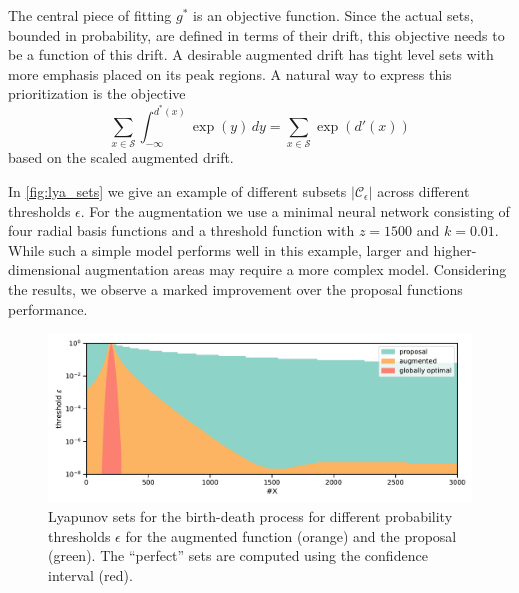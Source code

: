 The central piece of fitting $g^*$ is an objective function.
Since the actual sets, bounded in probability, are defined in terms of their drift, this objective needs to be a function of this drift.
A desirable augmented drift has tight level sets with more emphasis placed on its peak regions.
A natural way to express this prioritization is the objective
\[\sum_{x\in\mathcal{S}}\int_{-\infty}^{d^*(x)}\exp(y)\,dy = \sum_{x\in\mathcal{S}} \exp(d'(x)) \]
based on the scaled augmented drift.

In \autoref{fig:lya_sets} we give an example of different subsets $\left|\mathcal{C}_{\epsilon}\right|$ across different thresholds $\epsilon$.
For the augmentation we use a minimal neural network consisting of four radial basis functions and a threshold function with $z=1500$ and $k=0.01$.
While such a simple model performs well in this example, larger and higher-dimensional augmentation areas may require a more complex model.
Considering the results, we observe a marked improvement over the proposal functions performance.
\begin{figure}[htb]
\centering
\includegraphics[width=\textwidth]{gfx/lya_sets.pdf}
	\caption[Augmented v.\ proposal Lyapunov sets]{\label{fig:lya_sets}Lyapunov sets for the birth-death process for different probability thresholds $\epsilon$ for the augmented function (orange) and the proposal (green). The ``perfect'' sets are computed using the confidence interval (red).}
\end{figure}

